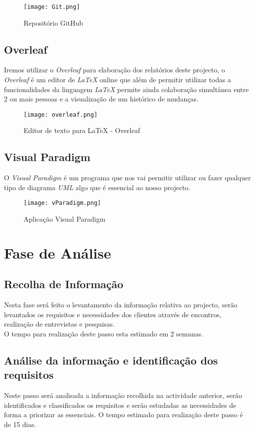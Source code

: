 \documentclass[a4paper]{article}
\begin{document}
\begin{figure}[H]
    \centering
    \texttt{[image: Git.png]}
    \caption{Repositório GitHub\texttrademark}
    \label{fig:github}
\end{figure}

\subsection{Overleaf}
Iremos utilizar o \textit{Overleaf} para elaboração dos relatórios deste projecto, o \textit{Overleaf} é um editor de \textit{LaTeX} online que além de permitir utilizar todas a funcionalidades da linguagem \textit{LaTeX} permite ainda colaboração simultânea entre 2 ou mais pessoas e a visualização de um histórico de mudanças.

\begin{figure}[H]
    \centering
    \texttt{[image: overleaf.png]}
    \caption{Editor de texto para LaTeX - Overleaf\texttrademark }
    \label{fig:overleaf}
\end{figure}

\subsection{Visual Paradigm}
O \textit{Visual Paradigm} é um programa que nos vai permitir utilizar ou fazer qualquer tipo de diagrama \textit{UML} algo que é essencial ao nosso projecto. 

\begin{figure}[H]
    \centering
    \texttt{[image: vParadigm.png]}
    \caption{Aplicação Visual Paradigm\texttrademark}
    \label{fig:VP}
\end{figure}

\section{Fase de Análise}
\subsection{Recolha de Informação}
 Nesta fase será feito o levantamento da informação relativa ao projecto, serão levantados os requisitos e necessidades dos clientes através de encontros, realização de entrevistas e pesquisas.\\
O tempo para realização deste passo esta estimado em 2 semanas. 
    
\subsection{Análise da informação e identificação dos requisitos}
Neste passo será analisada a informação recolhida na actividade anterior, serão identificados e classificados os requisitos e serão estudadas as necessidades de forma a priorizar as essenciais.
O tempo estimado para realização deste passo é de 15 dias.
\end{document}
